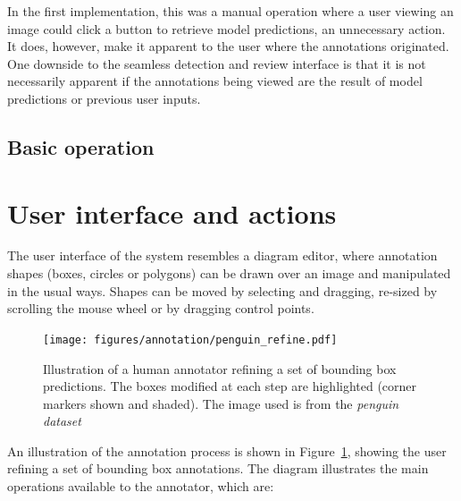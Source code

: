 In the first implementation, this was a manual operation where a user viewing an image could click a button to retrieve model predictions, an unnecessary action. It does, however, make it apparent to the user where the annotations originated. One downside to the seamless detection and review interface is that it is not necessarily apparent if the annotations being viewed are the result of model predictions or previous user inputs.

\subsection{Basic operation}


\section {User interface and actions}
\label{sec:user_interface}
 
The user interface of the system resembles a diagram editor, where annotation shapes (boxes, circles or polygons) can be drawn over an image and manipulated in the usual ways. Shapes can be moved by selecting and dragging, re-sized by scrolling the mouse wheel or by dragging control points. 

\begin{figure}[htb!]
  \centering
  \texttt{[image: figures/annotation/penguin\_refine.pdf]}
  \caption{Illustration of a human annotator refining a set of bounding box predictions. The boxes modified at each step are highlighted (corner markers shown and shaded). The image used is from the \emph{penguin dataset} \cite{PenguinData} }   
  \label{fig:penguin_refinement}
\end{figure}

An illustration of the annotation process is shown in Figure~\ref{fig:penguin_refinement}, showing the user refining a set of bounding box annotations. The diagram illustrates the main operations available to the annotator, which are:

